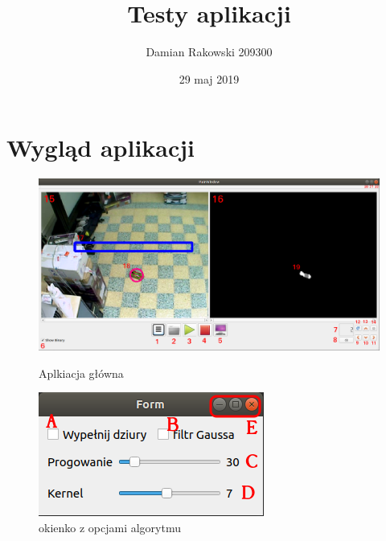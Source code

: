\documentclass[11pt,a4paper]{article}
\title{Testy aplikacji}
\author{Damian Rakowski 209300}
\date{29 maj 2019}
\begin{document}
\maketitle
\section{Wygląd aplikacji}
\begin{figure}[h]
\centering
\includegraphics[width=\textwidth]{aplikacja.png}
\caption{Aplkiacja główna}
\vspace{1.5cm}
\includegraphics[scale=1]{opcje.png}
\caption{okienko z opcjami algorytmu}
\end{figure}
\end{document}
